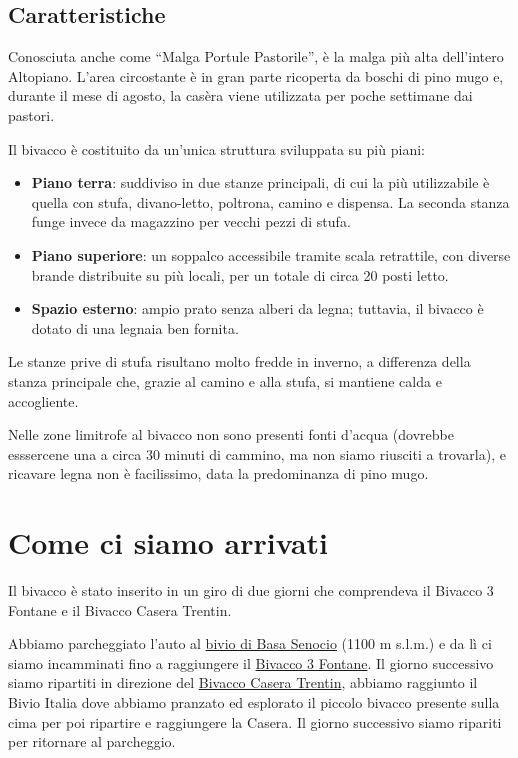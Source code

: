 \documentclass{article}
\begin{document}
\subsection{Caratteristiche}
Conosciuta anche come “Malga Portule Pastorile”, è la malga più alta dell’intero Altopiano. L’area circostante è in gran parte ricoperta da boschi di pino mugo e, durante il mese di agosto, la casèra viene utilizzata per poche settimane dai pastori.

Il bivacco è costituito da un’unica struttura sviluppata su più piani:
\begin{itemize}
    \item \textbf{Piano terra}: suddiviso in due stanze principali, di cui la più utilizzabile è quella con stufa, divano-letto, poltrona, camino e dispensa. La seconda stanza funge invece da magazzino per vecchi pezzi di stufa.
    \item \textbf{Piano superiore}: un soppalco accessibile tramite scala retrattile, con diverse brande distribuite su più locali, per un totale di circa 20 posti letto.
    \item \textbf{Spazio esterno}: ampio prato senza alberi da legna; tuttavia, il bivacco è dotato di una legnaia ben fornita.
\end{itemize}

Le stanze prive di stufa risultano molto fredde in inverno, a differenza della stanza principale che, grazie al camino e alla stufa, si mantiene calda e accogliente.

Nelle zone limitrofe al bivacco non sono presenti fonti d’acqua (dovrebbe esssercene una a circa 30 minuti di cammino, ma non siamo riusciti a trovarla), e ricavare legna non è facilissimo, data la predominanza di pino mugo.


\section{Come ci siamo arrivati}
Il bivacco è stato inserito in un giro di due giorni che comprendeva il Bivacco 3 Fontane e il Bivacco Casera Trentin.

Abbiamo parcheggiato l’auto al \href{https://maps.google.com/?q=45.92169696155084,11.476606212370115}{bivio di Basa Senocio} (1100 m s.l.m.) e da lì ci siamo incamminati fino a raggiungere il \href{https://maps.google.com/?q=45.96649411078783,11.494243131410462}{Bivacco 3 Fontane}. Il giorno successivo siamo ripartiti in direzione del \href{https://maps.google.com/?q=45.96667,11.45000}{Bivacco Casera Trentin}, abbiamo raggiunto il Bivio Italia dove abbiamo pranzato ed esplorato il piccolo bivacco presente sulla cima per poi ripartire e raggiungere la Casera. Il giorno successivo siamo ripariti per ritornare al parcheggio.
\end{document}
